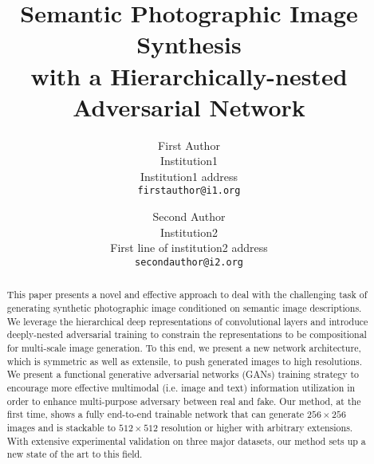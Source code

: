 \documentclass[10pt,twocolumn,letterpaper]{article}
\begin{document}
\title{Semantic Photographic Image Synthesis \\ with a Hierarchically-nested Adversarial Network}

\author{First Author\\
Institution1\\
Institution1 address\\
{\tt\small firstauthor@i1.org}
\and
Second Author\\
Institution2\\
First line of institution2 address\\
{\tt\small secondauthor@i2.org}
}

\maketitle

\begin{abstract}
This paper presents a novel  and effective approach to deal with the challenging task of generating synthetic photographic image conditioned on semantic image descriptions. We leverage the hierarchical deep representations of convolutional layers and introduce deeply-nested adversarial training to constrain the representations to be compositional for multi-scale image generation. To this end, we present a new network architecture, which is symmetric as well as extensile, to push generated images to high resolutions.  We present a functional generative adversarial networks (GANs) training strategy to encourage more effective multimodal (i.e. image and text) information utilization in order to enhance multi-purpose adversary between real and fake. Our method, at the first time, shows a fully end-to-end trainable network that can generate $256{\times}256$ images and is stackable to $512{\times}512$ resolution or higher with arbitrary extensions. With extensive experimental validation on three major datasets, our method sets up a new state of the art to this field. 

\end{abstract}


\end{document}
